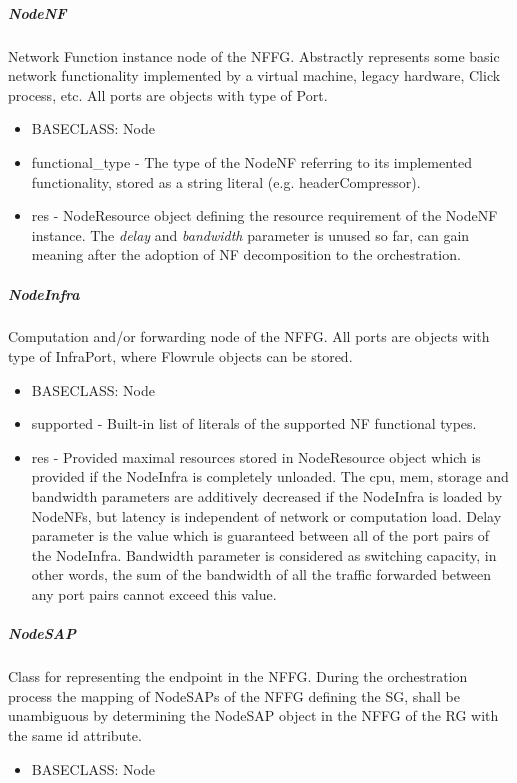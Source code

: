 \documentclass[a4paper,10pt]{scrartcl}
\begin{document}
\subparagraph{NodeNF}
Network Function instance node of the NFFG. Abstractly represents some basic network functionality 
implemented by a virtual machine, legacy hardware, Click process, etc. All ports are objects with type of Port.
\begin{itemize}
\item BASECLASS: Node
\item functional\_type - The type of the NodeNF referring to its implemented functionality, 
stored as a string literal (e.g. headerCompressor).
\item res - NodeResource object defining the resource requirement of the NodeNF instance. 
The \emph{delay} and \emph{bandwidth} parameter is unused so far, 
can gain meaning after the adoption of NF decomposition to the orchestration.
\end{itemize}

\subparagraph{NodeInfra}
Computation and/or forwarding node of the NFFG. All ports are objects with type of InfraPort, 
where Flowrule objects can be stored.
\begin{itemize}
\item BASECLASS: Node
\item supported - Built-in list of literals of the supported NF functional types.
\item res - Provided maximal resources stored in NodeResource object which is provided 
if the NodeInfra is completely unloaded. The cpu, mem, storage and bandwidth parameters are additively decreased 
if the NodeInfra is loaded by NodeNFs, but latency is independent of network or computation load. 
Delay parameter is the value which is guaranteed between all of the port pairs of the NodeInfra.
Bandwidth parameter is considered as switching capacity, in other words, 
the sum of the bandwidth of all the traffic forwarded between any port pairs cannot exceed this value.
\end{itemize}

\subparagraph{NodeSAP}
Class for representing the endpoint in the NFFG. During the orchestration process 
the mapping of NodeSAPs of the NFFG defining the SG, shall be unambiguous by determining 
the NodeSAP object in the NFFG of the RG with the same id attribute. 
\begin{itemize}
\item BASECLASS: Node
\end{itemize}
\end{document}
